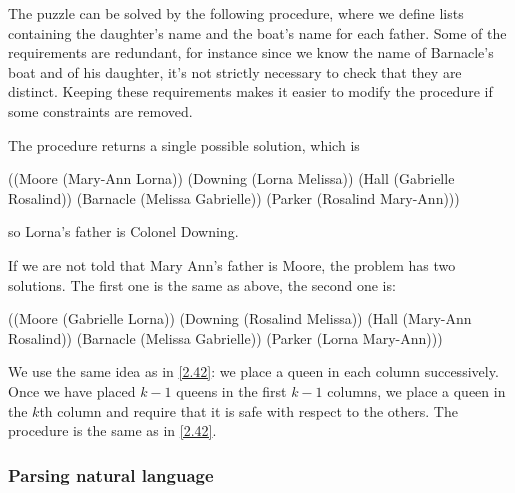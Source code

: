 \begin{exe}[4.43]
    The puzzle can be solved by the following procedure, where we define lists
    containing the daughter’s name and the boat’s name for each father.
    Some of the requirements are redundant, for instance since we know the name 
    of Barnacle’s boat and of his daughter, it’s not strictly necessary to check 
    that they are distinct. Keeping these requirements makes it easier to modify 
    the procedure if some constraints are removed.

    The procedure returns a single possible solution, which is
    \begin{cscm}
        ((Moore (Mary-Ann Lorna))
         (Downing (Lorna Melissa))
         (Hall (Gabrielle Rosalind))
         (Barnacle (Melissa Gabrielle))
         (Parker (Rosalind Mary-Ann)))
    \end{cscm}
    so Lorna’s father is Colonel Downing.

    If we are not told that Mary Ann’s father is Moore, the problem has two 
    solutions. The first one is the same as above, the second one is:
    \begin{cscm}
        ((Moore (Gabrielle Lorna))
         (Downing (Rosalind Melissa))
         (Hall (Mary-Ann Rosalind))
         (Barnacle (Melissa Gabrielle))
         (Parker (Lorna Mary-Ann)))
    \end{cscm}
\end{exe}

\begin{exe}[4.44]
    We use the same idea as in \autoref{2.42}: we place a queen in each column 
    successively. Once we have placed $k - 1$ queens in the first $k - 1$ 
    columns, we place a queen in the $k$th column and require that it is safe 
    with respect to the others. The  procedure is the same as in 
    \autoref{2.42}.
\end{exe}

\subsubsection{Parsing natural language}

